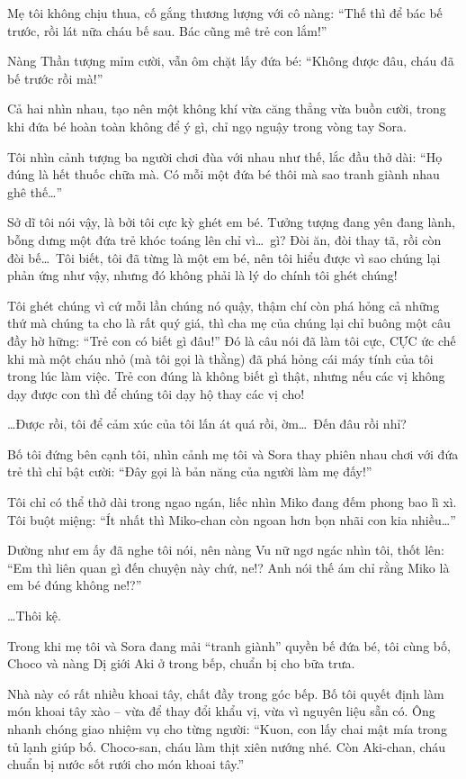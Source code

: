 \documentclass[../main.tex]{subfiles}
\begin{document}
Mẹ tôi không chịu thua, cố gắng thương lượng với cô nàng: ``Thế thì để bác bế trước, rồi lát nữa cháu bế sau. Bác cũng mê trẻ con lắm!''

Nàng Thần tượng mỉm cười, vẫn ôm chặt lấy đứa bé: ``Không được đâu, cháu đã bế trước rồi mà!''

Cả hai nhìn nhau, tạo nên một không khí vừa căng thẳng vừa buồn cười, trong khi đứa bé hoàn toàn không để ý gì, chỉ ngọ nguậy trong vòng tay Sora.

Tôi nhìn cảnh tượng ba người chơi đùa với nhau như thế, lắc đầu thở dài: ``Họ đúng là hết thuốc chữa mà. Có mỗi một đứa bé thôi mà sao tranh giành nhau ghê thế\dots''

Sở dĩ tôi nói vậy, là bởi tôi cực kỳ ghét em bé. Tưởng tượng đang yên đang lành, bỗng dưng một đứa trẻ khóc toáng lên chỉ vì\dots\ gì? Đòi ăn, đòi thay tã, rồi còn đòi bế\dots\ Tôi biết, tôi đã từng là một em bé, nên tôi hiểu được vì sao chúng lại phản ứng như vậy, nhưng đó không phải là lý do chính tôi ghét chúng!

Tôi ghét chúng vì cứ mỗi lần chúng nó quậy, thậm chí còn phá hỏng cả những thứ mà chúng ta cho là rất quý giá, thì cha mẹ của chúng lại chỉ buông một câu đầy hờ hững: ``Trẻ con có biết gì đâu!'' Đó là câu nói đã làm tôi cực, CỰC ức chế khi mà một cháu nhỏ (mà tôi gọi là thằng) đã phá hỏng cái máy tính của tôi trong lúc làm việc. Trẻ con đúng là không biết gì thật, nhưng nếu các vị không dạy được con thì để chúng tôi dạy hộ thay các vị cho!

\dots Được rồi, tôi để cảm xúc của tôi lấn át quá rồi, ờm\dots\ Đến đâu rồi nhỉ?

Bố tôi đứng bên cạnh tôi, nhìn cảnh mẹ tôi và Sora thay phiên nhau chơi với đứa trẻ thì chỉ bật cười: ``Đây gọi là bản năng của người làm mẹ đấy!''

Tôi chỉ có thể thở dài trong ngao ngán, liếc nhìn Miko đang đếm phong bao lì xì. Tôi buột miệng: ``Ít nhất thì Miko-chan còn ngoan hơn bọn nhãi con kia nhiều\dots''

Dường như em ấy đã nghe tôi nói, nên nàng Vu nữ ngơ ngác nhìn tôi, thốt lên: ``Em thì liên quan gì đến chuyện này chứ, ne!? Anh nói thế ám chỉ rằng Miko là em bé đúng không ne!?''

\dots Thôi kệ.

\ct

Trong khi mẹ tôi và Sora đang mải ``tranh giành'' quyền bế đứa bé, tôi cùng bố, Choco và nàng Dị giới Aki ở trong bếp, chuẩn bị cho bữa trưa.

Nhà này có rất nhiều khoai tây, chất đầy trong góc bếp. Bố tôi quyết định làm món khoai tây xào – vừa để thay đổi khẩu vị, vừa vì nguyên liệu sẵn có. Ông nhanh chóng giao nhiệm vụ cho từng người: ``Kuon, con lấy chai mật mía trong tủ lạnh giúp bố. Choco-san, cháu làm thịt xiên nướng nhé. Còn Aki-chan, cháu chuẩn bị nước sốt rưới cho món khoai tây.''
\end{document}
